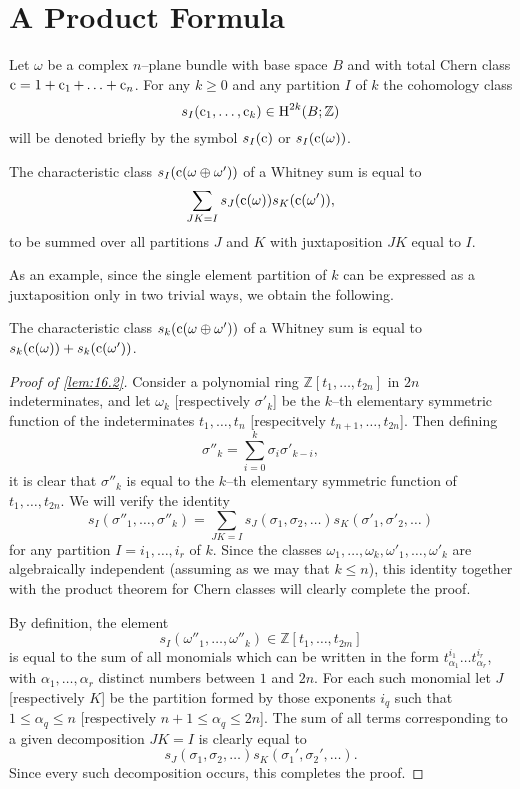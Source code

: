 \documentclass[../main]{subfiles}
\begin{document}
\section{A Product Formula}
Let $\omega$ be a complex $n$--plane bundle with base space $B$ and with total Chern class $\operatorname{c} = 1 + \operatorname{c}_1 + \ldots + \operatorname{c}_n$. For any $k \ge 0$ and any partition $I$ of $k$ the cohomology class \[s_I(\operatorname{c}_1, \ldots, \operatorname{c}_k) \in \operatorname{H}^{2k}(B; \mathbb Z)\] will be denoted briefly by the symbol $s_I(\operatorname{c})$ or $s_I(\operatorname{c}(\omega))$.

\begin{lemma}[Thom]
\label{lem:16.2}
The characteristic class $s_I(\operatorname{c}(\omega \oplus \omega'))$ of a Whitney sum is equal to \[\sum_{JK = I} s_J(\operatorname{c}(\omega)) s_K(\operatorname{c}(\omega')),\] to be summed over all partitions $J$ and $K$ with juxtaposition $JK$ equal to $I$. 
\end{lemma}

As an example, since the single element partition of $k$ can be expressed as a juxtaposition only in two trivial ways, we obtain the following. 

\begin{corollary}
The characteristic class $s_k(\operatorname{c}(\omega \oplus \omega'))$ of a Whitney sum is equal to $s_k(\operatorname{c}(\omega)) + s_k(\operatorname{c}(\omega'))$. 
\end{corollary}

\begin{proof}[Proof of \ref{lem:16.2}]
Consider a polynomial ring $\mathbb Z[t_1, \ldots, t_{2n}]$ in $2n$ indeterminates, and let $\omega_k$ [respectively $\sigma'_k$] be the $k$--th elementary symmetric function of the indeterminates $t_1, \ldots, t_n$ [respecitvely $t_{n + 1}, \ldots, t_{2n}$]. Then defining \[\sigma''_k = \sum_{i = 0}^k \sigma_i \sigma'_{k - i},\] it is clear that $\sigma''_k$ is equal to the $k$--th elementary symmetric function of $t_1, \ldots, t_{2n}$. We will verify the identity \[s_I(\sigma''_1, \ldots, \sigma''_k) = \sum_{JK = I} s_J(\sigma_1, \sigma_2, \ldots) s_K(\sigma'_1, \sigma'_2, \ldots)\] for any partition $I = i_1, \ldots, i_r$ of $k$. Since the classes $\omega_1, \ldots, \omega_k, \omega'_1, \ldots, \omega'_k$ are algebraically independent (assuming as we may that $k \le n$), this identity together with the product theorem for Chern classes will clearly complete the proof.

By definition, the element \[s_I(\omega''_1, \ldots, \omega''_k) \in \mathbb Z[t_1, \ldots, t_{2m}]\] is equal to the sum of all monomials which can be written in the form $t_{\alpha_1}^{i_1} \ldots t_{\alpha_r}^{i_r}$, with $\alpha_1, \ldots, \alpha_r$ distinct numbers between $1$ and $2n$. For each such monomial let $J$ [respectively $K$] be the partition formed by those exponents $i_q$ such that $1 \le \alpha_q \le n$ [respectively $n + 1 \le \alpha_q \le 2n$]. The sum of all terms corresponding to a given decomposition $JK = I$ is clearly equal to \[s_J(\sigma_1, \sigma_2, \ldots) s_K(\sigma_1', \sigma_2', \ldots).\] Since every such decomposition occurs, this completes the proof. 
\end{proof}
\end{document}
